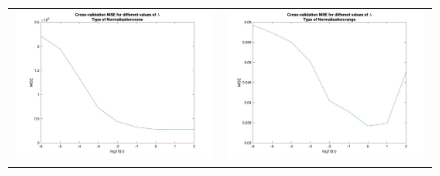 \documentclass[11pt]{article}
\begin{document}
\begin{figure}[H]
	\centering
	\begin{adjustbox}{width=0.8\paperwidth}
		\begin{tabular}{c c}
			\includegraphics{Codes/MSE_Plots_none.jpg} & \includegraphics{Codes/MSE_Plots_range.jpg}\\ 

\end{tabular}
\end{adjustbox}
\end{figure}
\end{document}
